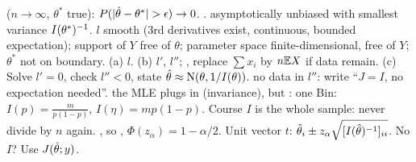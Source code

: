 \sk{} ($n\to\infty$, $\theta^*$ true):  $P(|\hth-\theta^*|>\epsilon)\to0$.  .  asymptotically unbiased with smallest variance $I(\theta^*)^{-1}$.
\sk{} $l$ smooth (3rd derivatives exist, continuous, bounded expectation); support of $Y$ free of $\theta$; parameter space finite-dimensional, free of $Y$; $\theta^*$ not on boundary.
\sk{} (a) $l$. (b) $l'$, $l''$; , replace $\sum x_i$ by $n\mathbb{E} X$ if data remain. (c) Solve $l'=0$, check $l''<0$, state $\hat{\theta}\approx\mathrm{N}(\theta,1/I(\theta))$.
\sk{} no data in $l''$: write “$J=I$, no expectation needed”.  the MLE plugs in (invariance), but : one Bin: $I(p)=\frac m{p(1-p)}$, $I(\eta)=mp(1-p)$. Course $I$ is the whole sample: never divide by $n$ again.
\bx
{} , so , $\Phi(z_\alpha)=1-\alpha/2$. Unit vector $t$: $\hat{\theta}_i\pm z_\alpha\sqrt{[I(\hat{\theta})^{-1}]_{ii}}$. No $I$? Use $J(\hat{\theta};y)$.
